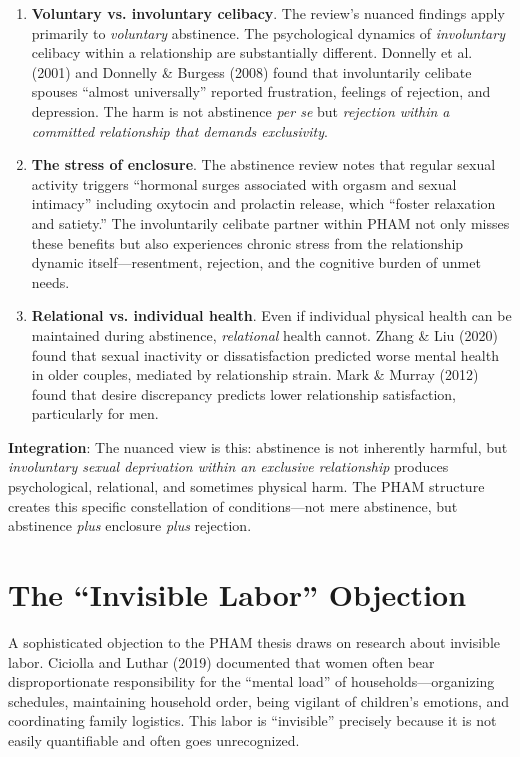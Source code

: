\documentclass[12pt,openany]{book}
\numberwithin{equation}{chapter}
\begin{document}
\begin{enumerate}
    \item \textbf{Voluntary vs. involuntary celibacy}. The review's nuanced findings apply primarily to \textit{voluntary} abstinence. The psychological dynamics of \textit{involuntary} celibacy within a relationship are substantially different. Donnelly et al. (2001) and Donnelly \& Burgess (2008) found that involuntarily celibate spouses ``almost universally'' reported frustration, feelings of rejection, and depression. The harm is not abstinence \textit{per se} but \textit{rejection within a committed relationship that demands exclusivity}.
    
    \item \textbf{The stress of enclosure}. The abstinence review notes that regular sexual activity triggers ``hormonal surges associated with orgasm and sexual intimacy'' including oxytocin and prolactin release, which ``foster relaxation and satiety.'' The involuntarily celibate partner within PHAM not only misses these benefits but also experiences chronic stress from the relationship dynamic itself---resentment, rejection, and the cognitive burden of unmet needs.
    
    \item \textbf{Relational vs. individual health}. Even if individual physical health can be maintained during abstinence, \textit{relational} health cannot. Zhang \& Liu (2020) found that sexual inactivity or dissatisfaction predicted worse mental health in older couples, mediated by relationship strain. Mark \& Murray (2012) found that desire discrepancy predicts lower relationship satisfaction, particularly for men.
\end{enumerate}

\textbf{Integration}: The nuanced view is this: abstinence is not inherently harmful, but \textit{involuntary sexual deprivation within an exclusive relationship} produces psychological, relational, and sometimes physical harm. The PHAM structure creates this specific constellation of conditions---not mere abstinence, but abstinence \textit{plus} enclosure \textit{plus} rejection.

\section{The ``Invisible Labor'' Objection}

A sophisticated objection to the PHAM thesis draws on research about invisible labor. Ciciolla and Luthar (2019) documented that women often bear disproportionate responsibility for the ``mental load'' of households---organizing schedules, maintaining household order, being vigilant of children's emotions, and coordinating family logistics. This labor is ``invisible'' precisely because it is not easily quantifiable and often goes unrecognized.
\end{document}
